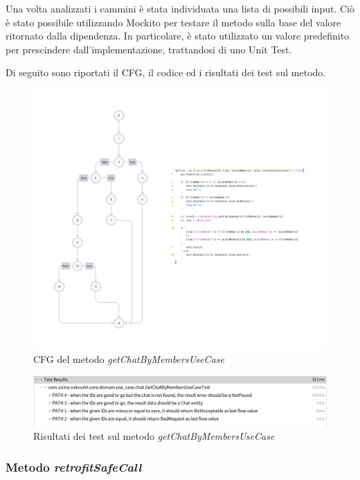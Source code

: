 \documentclass{natourDoc}
\begin{document}
Una volta analizzati i cammini è stata individuata una lista di possibili input. 
Ciò è stato possibile utilizzando Mockito per testare il metodo sulla base del valore ritornato dalla dipendenza. In particolare, è stato utilizzato un valore predefinito per prescindere dall'implementazione, trattandosi di uno Unit Test.

\newpage
Di seguito sono riportati il CFG, il codice ed i risultati dei test sul metodo.
\begin{figure}[!htbp]
	\centering
	\includegraphics[width=\textwidth]{code/chat-whitebox.pdf}
	\caption{CFG del metodo \textit{getChatByMembersUseCase}}
\end{figure}
\FloatBarrier



\begin{figure}[!htbp]
	\centering
	\includegraphics[width=\textwidth]{code/WHITEBOX-chat.png}
	\caption{Risultati dei test sul metodo \textit{getChatByMembersUseCase}}
\end{figure}

\newpage

\subsubsection{Metodo \textit{retrofitSafeCall}}
\end{document}
